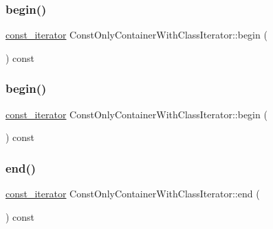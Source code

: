 \subsubsection{\texorpdfstring{begin()}{begin()}\hspace{0.1cm}{\footnotesize\ttfamily [1/2]}}
{\footnotesize\ttfamily \mbox{\hyperlink{struct_const_only_container_with_class_iterator_1_1const__iterator}{const\+\_\+iterator}} Const\+Only\+Container\+With\+Class\+Iterator\+::begin (\begin{DoxyParamCaption}{ }\end{DoxyParamCaption}) const}

\mbox{\label{struct_const_only_container_with_class_iterator_a30be5262acd17c34d19b19d560ebd541}} 
\subsubsection{\texorpdfstring{begin()}{begin()}\hspace{0.1cm}{\footnotesize\ttfamily [2/2]}}
{\footnotesize\ttfamily \mbox{\hyperlink{struct_const_only_container_with_class_iterator_1_1const__iterator}{const\+\_\+iterator}} Const\+Only\+Container\+With\+Class\+Iterator\+::begin (\begin{DoxyParamCaption}{ }\end{DoxyParamCaption}) const}

\mbox{\label{struct_const_only_container_with_class_iterator_a3d6e17f17eecd7b1ef02afc9a75a0bde}} 
\subsubsection{\texorpdfstring{end()}{end()}\hspace{0.1cm}{\footnotesize\ttfamily [1/2]}}
{\footnotesize\ttfamily \mbox{\hyperlink{struct_const_only_container_with_class_iterator_1_1const__iterator}{const\+\_\+iterator}} Const\+Only\+Container\+With\+Class\+Iterator\+::end (\begin{DoxyParamCaption}{ }\end{DoxyParamCaption}) const}

